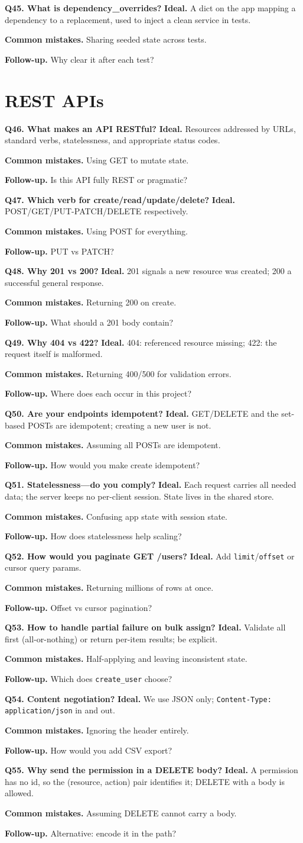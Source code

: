 \documentclass[11pt,a4paper]{report}
\newcommand{\qa}[3]{%
  \textbf{Ideal.} #1\par
  \textbf{Common mistakes.} #2\par
  \textbf{Follow-up.} #3\par
  \vspace{4pt}
}
\begin{document}
\textbf{Q45. What is dependency\_overrides?}
\qa{A dict on the app mapping a dependency to a replacement, used to inject a
clean service in tests.}
{Sharing seeded state across tests.}
{Why clear it after each test?}

\section{REST APIs}

\textbf{Q46. What makes an API RESTful?}
\qa{Resources addressed by URLs, standard verbs, statelessness, and appropriate
status codes.}
{Using GET to mutate state.}
{Is this API fully REST or pragmatic?}

\textbf{Q47. Which verb for create/read/update/delete?}
\qa{POST/GET/PUT-PATCH/DELETE respectively.}
{Using POST for everything.}
{PUT vs PATCH?}

\textbf{Q48. Why 201 vs 200?}
\qa{201 signals a new resource was created; 200 a successful general response.}
{Returning 200 on create.}
{What should a 201 body contain?}

\textbf{Q49. Why 404 vs 422?}
\qa{404: referenced resource missing; 422: the request itself is malformed.}
{Returning 400/500 for validation errors.}
{Where does each occur in this project?}

\textbf{Q50. Are your endpoints idempotent?}
\qa{GET/DELETE and the set-based POSTs are idempotent; creating a new user is
not.}
{Assuming all POSTs are idempotent.}
{How would you make create idempotent?}

\textbf{Q51. Statelessness---do you comply?}
\qa{Each request carries all needed data; the server keeps no per-client session.
State lives in the shared store.}
{Confusing app state with session state.}
{How does statelessness help scaling?}

\textbf{Q52. How would you paginate GET /users?}
\qa{Add \texttt{limit}/\texttt{offset} or cursor query params.}
{Returning millions of rows at once.}
{Offset vs cursor pagination?}

\textbf{Q53. How to handle partial failure on bulk assign?}
\qa{Validate all first (all-or-nothing) or return per-item results; be explicit.}
{Half-applying and leaving inconsistent state.}
{Which does \texttt{create\_user} choose?}

\textbf{Q54. Content negotiation?}
\qa{We use JSON only; \texttt{Content-Type: application/json} in and out.}
{Ignoring the header entirely.}
{How would you add CSV export?}

\textbf{Q55. Why send the permission in a DELETE body?}
\qa{A permission has no id, so the (resource, action) pair identifies it; DELETE
with a body is allowed.}
{Assuming DELETE cannot carry a body.}
{Alternative: encode it in the path?}
\end{document}
